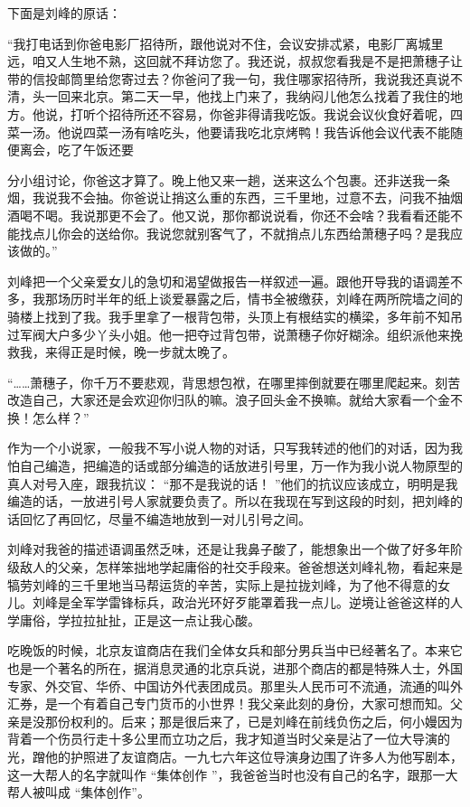 \documentclass[12pt,twoside,openany]{book}
\begin{document}
下面是刘峰的原话：

“我打电话到你爸电影厂招待所，跟他说对不住，会议安排忒紧，电影厂离城里远，咱又人生地不熟，这回就不拜访您了。我还说，叔叔您看我是不是把萧穗子让带的信投邮筒里给您寄过去？你爸问了我一句，我住哪家招待所，我说我还真说不清，头一回来北京。第二天一早，他找上门来了，我纳闷儿他怎么找着了我住的地方。他说，打听个招待所还不容易，你爸非得请我吃饭。我说会议伙食好着呢，四菜一汤。他说四菜一汤有啥吃头，他要请我吃北京烤鸭！我告诉他会议代表不能随便离会，吃了午饭还要

分小组讨论，你爸这才算了。晚上他又来一趟，送来这么个包裹。还非送我一条烟，我说我不会抽。你爸说让捎这么重的东西，三千里地，过意不去，问我不抽烟酒喝不喝。我说那更不会了。他又说，那你都说说看，你还不会啥？我看看还能不能找点儿你会的送给你。我说您就别客气了，不就捎点儿东西给萧穗子吗？是我应该做的。”

刘峰把一个父亲爱女儿的急切和渴望做报告一样叙述一遍。跟他开导我的语调差不多，我那场历时半年的纸上谈爱暴露之后，情书全被缴获，刘峰在两所院墙之间的骑楼上找到了我。我手里拿了一根背包带，头顶上有根结实的横梁，多年前不知吊过军阀大户多少丫头小姐。他一把夺过背包带，说萧穗子你好糊涂。组织派他来挽救我，来得正是时候，晚一步就太晚了。

“……萧穗子，你千万不要悲观，背思想包袱，在哪里摔倒就要在哪里爬起来。刻苦改造自己，大家还是会欢迎你归队的嘛。浪子回头金不换嘛。就给大家看一个金不换！怎么样？”

作为一个小说家，一般我不写小说人物的对话，只写我转述的他们的对话，因为我怕自己编造，把编造的话或部分编造的话放进引号里，万一作为我小说人物原型的真人对号入座，跟我抗议： “那不是我说的话！ ”他们的抗议应该成立，明明是我编造的话，一放进引号人家就要负责了。所以在我现在写到这段的时刻，把刘峰的话回忆了再回忆，尽量不编造地放到一对儿引号之间。

刘峰对我爸的描述语调虽然乏味，还是让我鼻子酸了，能想象出一个做了好多年阶级敌人的父亲，怎样笨拙地学起庸俗的社交手段来。爸爸想送刘峰礼物，看起来是犒劳刘峰的三千里地当马帮运货的辛苦，实际上是拉拢刘峰，为了他不得意的女儿。刘峰是全军学雷锋标兵，政治光环好歹能罩着我一点儿。逆境让爸爸这样的人学庸俗，学拉拉扯扯，正是这一点让我心酸。

吃晚饭的时候，北京友谊商店在我们全体女兵和部分男兵当中已经著名了。本来它也是一个著名的所在，据消息灵通的北京兵说，进那个商店的都是特殊人士，外国专家、外交官、华侨、中国访外代表团成员。那里头人民币可不流通，流通的叫外汇券，是一个有着自己专门货币的小世界！我父亲此刻的身份，大家可想而知。父亲是没那份权利的。后来；那是很后来了，已是刘峰在前线负伤之后，何小嫚因为背着一个伤员行走十多公里而立功之后，我才知道当时父亲是沾了一位大导演的光，蹭他的护照进了友谊商店。一九七六年这位导演身边围了许多人为他写剧本，这一大帮人的名字就叫作 “集体创作 ”，我爸爸当时也没有自己的名字，跟那一大帮人被叫成 “集体创作”。
\end{document}
